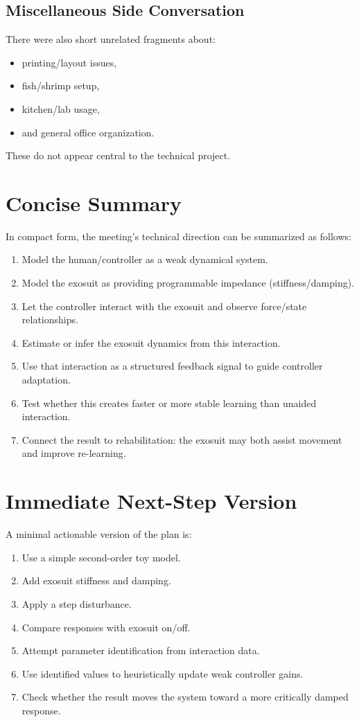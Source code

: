 \documentclass[11pt]{article}
\begin{document}
\subsection{Miscellaneous Side Conversation}
There were also short unrelated fragments about:
\begin{itemize}[leftmargin=1.5em]
    \item printing/layout issues,
    \item fish/shrimp setup,
    \item kitchen/lab usage,
    \item and general office organization.
\end{itemize}

These do not appear central to the technical project.

\section{Concise Summary}
In compact form, the meeting's technical direction can be summarized as follows:

\begin{enumerate}[leftmargin=1.5em]
    \item Model the human/controller as a weak dynamical system.
    \item Model the exosuit as providing programmable impedance (stiffness/damping).
    \item Let the controller interact with the exosuit and observe force/state relationships.
    \item Estimate or infer the exosuit dynamics from this interaction.
    \item Use that interaction as a structured feedback signal to guide controller adaptation.
    \item Test whether this creates faster or more stable learning than unaided interaction.
    \item Connect the result to rehabilitation: the exosuit may both assist movement and improve re-learning.
\end{enumerate}

\section{Immediate Next-Step Version}
A minimal actionable version of the plan is:

\begin{enumerate}[leftmargin=1.5em]
    \item Use a simple second-order toy model.
    \item Add exosuit stiffness and damping.
    \item Apply a step disturbance.
    \item Compare responses with exosuit on/off.
    \item Attempt parameter identification from interaction data.
    \item Use identified values to heuristically update weak controller gains.
    \item Check whether the result moves the system toward a more critically damped response.
\end{enumerate}
\end{document}
